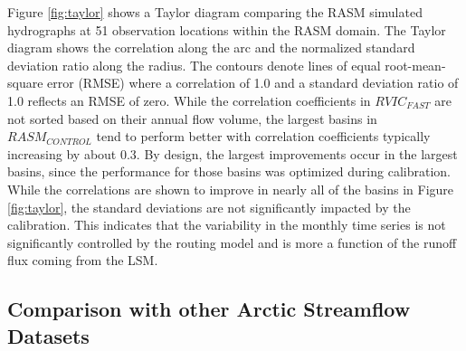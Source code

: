 \documentclass[jgrga, draft]{agutex}
\begin{document}
\begin{article}
Figure \ref{fig:taylor} shows a Taylor diagram comparing the RASM simulated hydrographs at 51 observation locations within the RASM domain.
The Taylor diagram shows the correlation along the arc and the normalized standard deviation ratio along the radius.
The contours denote lines of equal root-mean-square error (RMSE) where a correlation of 1.0 and a standard deviation ratio of 1.0 reflects an RMSE of zero.
While the correlation coefficients in $RVIC_{FAST}$ are not sorted based on their annual flow volume, the largest basins in $RASM_{CONTROL}$ tend to perform better with correlation coefficients typically increasing by about 0.3.
By design, the largest improvements occur in the largest basins, since the performance for those basins was optimized during calibration.
While the correlations are shown to improve in nearly all of the basins in Figure \ref{fig:taylor}, the standard deviations are not significantly impacted by the calibration.
This indicates that the variability in the monthly time series is not significantly controlled by the routing model and is more a function of the runoff flux coming from the LSM.

\subsection{Comparison with other Arctic Streamflow Datasets}
\label{sec:coastal_streamflow}


\end{article}
\end{document}
